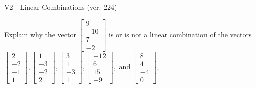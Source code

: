 \begin{exercise}
  \begin{exerciseTitle}V2 - Linear Combinations (ver. 224)\end{exerciseTitle}
  \begin{exerciseStatement}
    Explain why the vector \(\left[\begin{array}{c}
9 \\
-10 \\
7 \\
-2
\end{array}\right]\)  is or is not a linear 
	combination of the vectors \(\left[\begin{array}{c}
2 \\
-2 \\
-1 \\
1
\end{array}\right] , \left[\begin{array}{c}
1 \\
-3 \\
-2 \\
2
\end{array}\right] , \left[\begin{array}{c}
3 \\
1 \\
-3 \\
1
\end{array}\right] , \left[\begin{array}{c}
-12 \\
6 \\
15 \\
-9
\end{array}\right] , \text{ and } \left[\begin{array}{c}
8 \\
4 \\
-4 \\
0
\end{array}\right]\).
	



\end{exerciseStatement}
\end{exercise}
